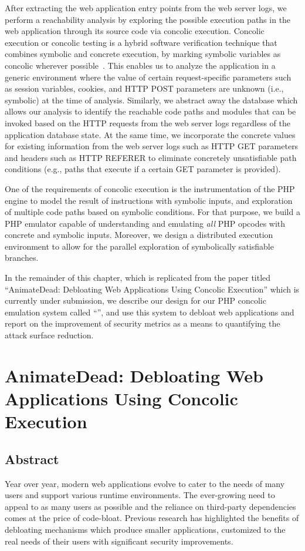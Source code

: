 After extracting the web application entry points from the web server logs, we perform a reachability analysis by exploring the possible execution paths in the web application through its source code via concolic execution. 
Concolic execution or concolic testing is a hybrid software verification technique that combines symbolic and concrete execution, by marking symbolic variables as concolic wherever possible~\cite{sen2007concolic}. 
This enables us to analyze the application in a generic environment where the value of certain request-specific parameters such as session variables, cookies, and HTTP POST parameters are unknown (i.e., symbolic) at the time of analysis. 
Similarly, we abstract away the database which allows our analysis to identify the reachable code paths and modules that can be invoked based on the HTTP requests from the web server logs regardless of the application database state. 
At the same time, we incorporate the concrete values for existing information from the web server logs such as HTTP GET parameters and headers such as HTTP REFERER to eliminate concretely unsatisfiable path conditions (e.g., paths that execute if a certain GET parameter is provided). 

One of the requirements of concolic execution is the instrumentation of the PHP engine to model the result of instructions with symbolic inputs, and exploration of multiple code paths based on symbolic conditions. 
For that purpose, we build a PHP emulator capable of understanding and emulating \emph{all} PHP opcodes with concrete and symbolic inputs. 
Moreover, we design a distributed execution environment to allow for the parallel exploration of symbolically satisfiable branches. 

In the remainder of this chapter, which is replicated from the paper titled ``AnimateDead: Debloating Web Applications Using Concolic Execution'' which is currently under submission, we describe our design for our PHP concolic emulation system called ``\animatedead{}'', and use this system to debloat web applications and report on the improvement of security metrics as a means to quantifying the attack surface reduction. 

\pagebreak{}

\section*{AnimateDead: Debloating Web Applications Using Concolic Execution}

\subsection*{Abstract}
Year over year, modern web applications evolve to cater to the needs of many users and support various runtime environments. 
The ever-growing need to appeal to as many users as possible and the reliance on third-party dependencies comes at the price of code-bloat. 
Previous research has highlighted the benefits of debloating mechanisms which produce smaller applications, customized to the real needs of their users with significant security improvements. 

